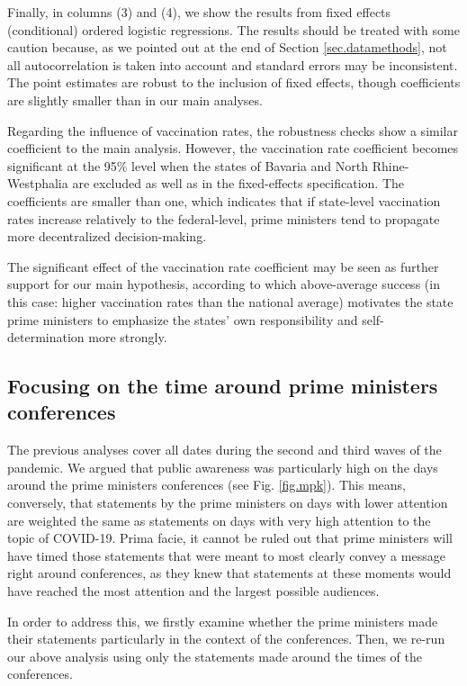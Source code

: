 \documentclass[authoryear,12pt, 3p]{elsarticle} %
\theoremstyle{break}
\begin{document}
Finally, in columns (3) and (4), we show the results from fixed effects (conditional) ordered logistic regressions. The results should be treated with some caution because, as we pointed out at the end of Section \ref{sec.datamethods}, not all autocorrelation is taken into account and standard errors may be inconsistent. The point estimates are robust to the inclusion of fixed effects, though coefficients are slightly smaller than in our main analyses.

Regarding the influence of vaccination rates, the robustness checks show a similar coefficient to the main analysis. However, the vaccination rate coefficient becomes significant at the 95\% level when the states of Bavaria and North Rhine-Westphalia are excluded as well as in the fixed-effects specification. The coefficients are smaller than one, which indicates that if state-level vaccination rates increase relatively to the federal-level, prime ministers tend to propagate more decentralized decision-making.

The significant effect of the vaccination rate coefficient may be seen as further support for our main hypothesis, according to which above-average success (in this case: higher vaccination rates than the national average) motivates the state prime ministers to emphasize the states' own responsibility and self-determination more strongly. 	

\subsection{Focusing on the time around prime ministers conferences}
The previous analyses cover all dates during the second and third waves of the pandemic. We argued that public awareness was particularly high on the days around the prime ministers conferences (see Fig. \ref{fig.mpk}). This means, conversely, that statements by the prime ministers on days with lower attention are weighted the same as statements on days with very high attention to the topic of COVID-19. Prima facie, it cannot be ruled out that prime ministers will have timed those statements that were meant to most clearly convey a message right around conferences, as they knew that statements at these moments would have reached the most attention and the largest possible audiences.



In order to address this, we firstly examine whether the prime ministers made their statements particularly in the context of the conferences. Then, we re-run our above analysis using only the statements made around the times of the conferences.
\end{document}

